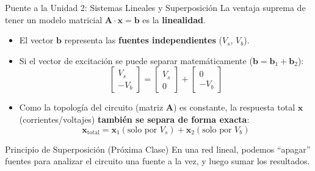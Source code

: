 \documentclass[aspectratio=169, 10pt]{beamer}
\begin{document}
\begin{frame}{Puente a la Unidad 2: Sistemas Lineales y Superposición}
    La ventaja suprema de tener un modelo matricial $\mathbf{A} \cdot \mathbf{x} = \mathbf{b}$ es la \textbf{linealidad}.
    
    \vspace{0.2cm}
    \begin{itemize}
        \item El vector $\mathbf{b}$ representa las \textbf{fuentes independientes} ($V_s$, $V_b$).
        \item Si el vector de excitación se puede separar matemáticamente ($\mathbf{b} = \mathbf{b}_1 + \mathbf{b}_2$):
        $$ \begin{bmatrix} V_s \\ -V_b \end{bmatrix} = \begin{bmatrix} V_s \\ 0 \end{bmatrix} + \begin{bmatrix} 0 \\ -V_b \end{bmatrix} $$
        \item Como la topología del circuito (matriz $\mathbf{A}$) es constante, la respuesta total $\mathbf{x}$ (corrientes/voltajes) \textbf{también se separa de forma exacta}:
        $$ \mathbf{x}_{\text{total}} = \mathbf{x}_1 (\text{solo por } V_s) + \mathbf{x}_2 (\text{solo por } V_b) $$
    \end{itemize}
    \vspace{0.2cm}
    \begin{block}{Principio de Superposición (Próxima Clase)}
        En una red lineal, podemos ``apagar'' fuentes para analizar el circuito una fuente a la vez, y luego sumar los resultados.
    \end{block}
\end{frame}
\end{document}
